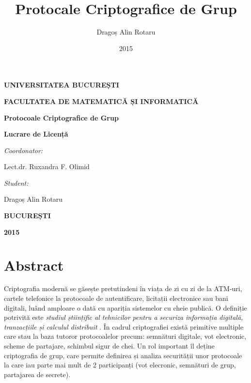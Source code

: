 \documentclass[oneside, 12pt]{book}
\title{Protocale Criptografice de Grup}
\author{Dragoș Alin Rotaru}
\date{2015}
\begin{document}
\thispagestyle{empty}

\nocite*{}

\begin{center}
\centerline{\bf UNIVERSITATEA BUCUREȘTI}
\centerline{\bf FACULTATEA DE MATEMATICĂ ȘI INFORMATICĂ}

\end{center}
\vspace{4.5cm}

\centerline{\huge \bf Protocoale Criptografice de Grup}

\vspace{0.5cm}

\centerline{\large \bf Lucrare de Licență}

\vspace{3.5cm}

\begin{flushleft}
{\Large \textit{Coordonator:}\vspace{0.2cm}}

{\Large Lect.dr. Ruxandra F. Olimid}
\end{flushleft}

\vspace{1cm}
\begin{flushright}
{\Large \textit{Student:}\vspace{0.2cm}}

{\Large Dragoș Alin Rotaru}
\end{flushright}


\vspace{2cm}

\centerline{\bf BUCUREȘTI}

\centerline{\bf 2015}

\chapter*{Abstract}

\hspace*{5mm} Criptografia modernă se găsește pretutindeni în viața de zi cu zi de la ATM-uri, cartele telefonice la protocoale de autentificare, licitații electronice sau bani digitali, luând amploare o dată cu apariția sistemelor cu cheie publică. O definiție potrivită este \textit{studiul științific al tehnicilor pentru a securiza informația digitală, tranzacțiile și calculul distribuit} \cite{Katz:2007}. În cadrul criptografiei există primitive multiple care stau la baza tutoror protocoalelor precum: semnături digitale, vot electronic, scheme de partajare, schimbul sigur de chei. Un rol important îl deține criptografia de grup, care permite definirea și analiza securității unor protocoale la care iau parte mai mult de 2 participanți (vot elecronic, semnături de grup, partajarea de secrete).
\end{document}
